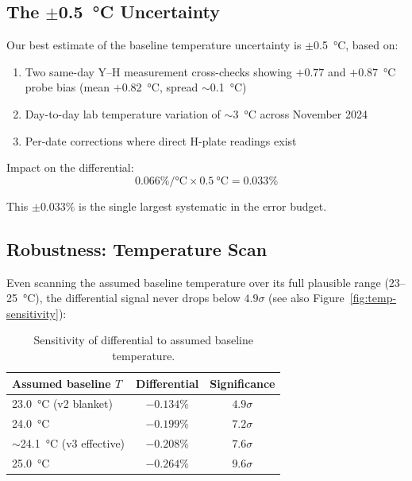 \documentclass[11pt,letterpaper]{article}
\begin{document}
\subsection{The $\pm$\SI{0.5}{\degreeCelsius} Uncertainty}

Our best estimate of the baseline temperature uncertainty is
$\pm$\SI{0.5}{\degreeCelsius}, based on:

\begin{enumerate}[nosep]
  \item Two same-day Y--H measurement cross-checks showing $+0.77$ and
    $+$\SI{0.87}{\degreeCelsius} probe bias (mean $+$\SI{0.82}{\degreeCelsius},
    spread ${\sim}$\SI{0.1}{\degreeCelsius})
  \item Day-to-day lab temperature variation of ${\sim}$\SI{3}{\degreeCelsius}
    across November 2024
  \item Per-date corrections where direct H-plate readings exist
\end{enumerate}

Impact on the differential:
\begin{equation*}
0.066\%/\si{\degreeCelsius} \times \SI{0.5}{\degreeCelsius} = 0.033\%
\end{equation*}

This $\pm 0.033\%$ is the single largest systematic in the error budget.

\subsection{Robustness: Temperature Scan}

Even scanning the assumed baseline temperature over its full plausible range
(23--\SI{25}{\degreeCelsius}), the differential signal never drops below
$4.9\sigma$ (see also Figure~\ref{fig:temp-sensitivity}):

\begin{table}[htbp]
\centering
\caption{Sensitivity of differential to assumed baseline temperature.}
\label{tab:tempscan}
\begin{tabular}{@{}lcc@{}}
\toprule
Assumed baseline $T$ & Differential & Significance \\
\midrule
\SI{23.0}{\degreeCelsius} (v2 blanket) & $-0.134\%$ & $4.9\sigma$ \\
\SI{24.0}{\degreeCelsius}              & $-0.199\%$ & $7.2\sigma$ \\
${\sim}$\SI{24.1}{\degreeCelsius} (v3 effective) & $-0.208\%$ & $7.6\sigma$ \\
\SI{25.0}{\degreeCelsius}              & $-0.264\%$ & $9.6\sigma$ \\
\bottomrule
\end{tabular}
\end{table}
\end{document}
